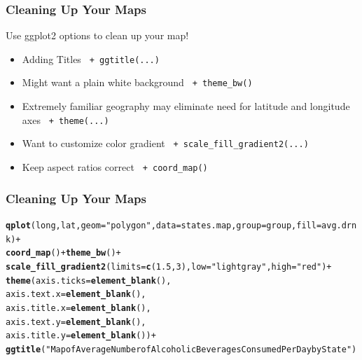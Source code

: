 \documentclass{beamer}\usepackage[]{graphicx}\usepackage[]{color}
\makeatletter
\newcommand{\hlnum}[1]{\textcolor[rgb]{0.686,0.059,0.569}{#1}}%
\newcommand{\hlstr}[1]{\textcolor[rgb]{0.192,0.494,0.8}{#1}}%
\newcommand{\hlopt}[1]{\textcolor[rgb]{0,0,0}{#1}}%
\newcommand{\hlstd}[1]{\textcolor[rgb]{0.345,0.345,0.345}{#1}}%
\newcommand{\hlkwc}[1]{\textcolor[rgb]{0.333,0.667,0.333}{#1}}%
\newcommand{\hlkwd}[1]{\textcolor[rgb]{0.737,0.353,0.396}{\textbf{#1}}}%
\newenvironment{kframe}{%
 \def\at@end@of@kframe{}%
 \ifinner\ifhmode%
  \def\at@end@of@kframe{\end{minipage}}%
  \begin{minipage}{\columnwidth}%
 \fi\fi%
 \def\FrameCommand##1{\hskip\@totalleftmargin \hskip-\fboxsep
 \colorbox{shadecolor}{##1}\hskip-\fboxsep
     \hskip-\linewidth \hskip-\@totalleftmargin \hskip\columnwidth}%
 \MakeFramed {\advance\hsize-\width
   \@totalleftmargin\z@ \linewidth\hsize
   \@setminipage}}%
 {\par\unskip\endMakeFramed%
 \at@end@of@kframe}
\newenvironment{knitrout}{}{} %
\makeatother
\begin{document}
\begin{frame}
    \frametitle{Cleaning Up Your Maps}
   Use ggplot2 options to clean up your map!
    \begin{itemize}
      \item Adding Titles \texttt{ + ggtitle(...)}
      \item Might want a plain white background \texttt{ + theme\_bw()}
      \item Extremely familiar geography may eliminate need for latitude and longitude axes \texttt{ + theme(...)}
      \item Want to customize color gradient   \texttt{ + scale\_fill\_gradient2(...) }
      \item Keep aspect ratios correct   \texttt{ + coord\_map() }
    \end{itemize}    
\end{frame}




\begin{frame}[fragile]
    \frametitle{Cleaning Up Your Maps}

\begin{knitrout}\footnotesize
{}\color{fgcolor}\begin{kframe}
\begin{alltt}
\hlkwd{qplot}\hlstd{(long, lat,} \hlkwc{geom}\hlstd{=}\hlstr{"polygon"}\hlstd{,} \hlkwc{data}\hlstd{=states.map,} \hlkwc{group}\hlstd{=group,} \hlkwc{fill}\hlstd{=avg.drnk)} \hlopt{+}
  \hlkwd{coord_map}\hlstd{()} \hlopt{+}  \hlkwd{theme_bw}\hlstd{()} \hlopt{+}
  \hlkwd{scale_fill_gradient2}\hlstd{(}\hlkwc{limits}\hlstd{=}\hlkwd{c}\hlstd{(}\hlnum{1.5}\hlstd{,} \hlnum{3}\hlstd{),}\hlkwc{low}\hlstd{=}\hlstr{"lightgray"}\hlstd{,}\hlkwc{high}\hlstd{=}\hlstr{"red"}\hlstd{)} \hlopt{+}
  \hlkwd{theme}\hlstd{(}\hlkwc{axis.ticks} \hlstd{=} \hlkwd{element_blank}\hlstd{(),}
       \hlkwc{axis.text.x} \hlstd{=} \hlkwd{element_blank}\hlstd{(),}
       \hlkwc{axis.title.x}\hlstd{=}\hlkwd{element_blank}\hlstd{(),}
       \hlkwc{axis.text.y} \hlstd{=} \hlkwd{element_blank}\hlstd{(),}
       \hlkwc{axis.title.y}\hlstd{=}\hlkwd{element_blank}\hlstd{())} \hlopt{+}
  \hlkwd{ggtitle}\hlstd{(}\hlstr{"Map of Average Number of Alcoholic Beverages Consumed Per Day by State"}\hlstd{)}
\end{alltt}
\end{kframe}
\end{knitrout}

\end{frame}
 
\end{document}
